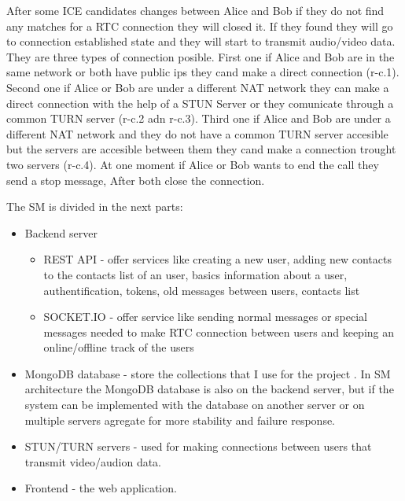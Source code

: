 After some ICE candidates changes between Alice and
Bob if they do not find any matches for a RTC connection they will closed it. If they found they will go to connection
established state and they will start to transmit audio/video data. They are three types of connection posible.
First one if Alice and Bob are in the same network or both have public ips they cand make a direct connection (r-c.1).
Second one if Alice or Bob are under a different NAT network they can make a direct connection with the help of a STUN Server
or they comunicate through a common TURN server (r-c.2 adn r-c.3). Third one if Alice and Bob are under a different NAT
network and they do not have a common TURN server accesible but the servers are accesible between them they cand make
a connection trought two servers (r-c.4). At one moment if Alice or Bob wants to end the call they send a stop message, After
both close the connection.



The SM is divided in the next parts:
\begin{itemize}
  \item Backend server
    \begin{itemize}
        \item REST API -
        offer services like creating a new user, adding new contacts to the contacts list of an user,
        basics information about a user, authentification, tokens, old messages between users, contacts list
        \item SOCKET.IO -
        offer service like sending normal messages or special messages needed to make RTC connection
        between users and keeping an online/offline track of the users
    \end{itemize}
  \item MongoDB database - store the collections that I use for the project .
    In SM architecture the MongoDB
    database is also on the backend server, but if the system can be implemented with the database
    on another server or on multiple servers agregate for more stability and failure response.
  \item STUN/TURN servers - used for making connections between users that transmit video/audion data.
  \item Frontend - the web application.
\end{itemize}



